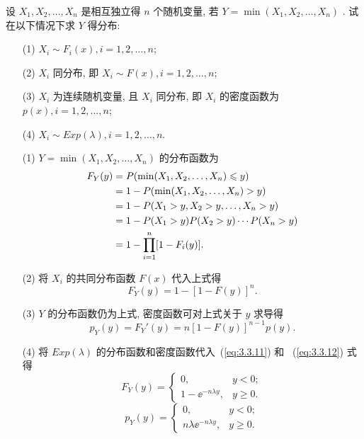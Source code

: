    \begin{example}[最小值分布]\label{exam:3.3.5}
   	设 $X_1,X_2,\ldots,X_n$ 是相互独立得 $n$ 个随机变量, 若 $Y=\min(X_1,X_2,\ldots,X_n)$ . 试在以下情况下求 $Y$ 得分布:
   	\begin{itemize}
   		\item[(1)] $X_i\sim F_i(x),i=1,2,\ldots,n$;
   		\item[(2)] $X_i$ 同分布, 即 $X_i\sim F(x),i=1,2,\ldots,n$;
   		\item[(3)] $X_i$ 为连续随机变量, 且 $X_i$ 同分布, 即 $X_i$ 的密度函数为 $p(x),i=1,2,\ldots,n$;
   		\item[(4)] $X_i\sim Exp(\lambda),i=1,2,\ldots,n$.
   	\end{itemize}
   	\begin{solution}
   		\begin{itemize}
   			\item[(1)] $Y=\min(X_1,X_2,\ldots,X_n)$ 的分布函数为
   			\begin{align}
   				F_Y(y)&=P(\min(X_1,X_2,\ldots,X_n)\leqslant y)\notag\\
   				&=1-P(\min(X_1,X_2,\ldots,X_n)>y)\notag\\
   				&=1-P(X_1>y,X_2>y,\ldots,X_n>y)\notag\\
   				&=1-P(X_1>y)P(X_2>y)\cdots P(X_n>y)\notag\\
   				&=1-\prod_{i=1}^{n}[1-F_i(y)].\label{eq:3.3.10}
   			\end{align}
   			\item[(2)] 将 $X_i$ 的共同分布函数 $F(x)$ 代入上式得
   			\begin{equation}
   				F_Y(y)=1-[1-F(y)]^n.\label{eq:3.3.11}
   			\end{equation}
   			\item[(3)] $Y$ 的分布函数仍为上式, 密度函数可对上式关于 $y$ 求导得
   			\begin{equation}
   				p_Y(y)=F_Y'(y)=n[1-F(y)]^{n-1}p(y).\label{eq:3.3.12}
   			\end{equation}
   			\item[(4)] 将 $Exp(\lambda)$ 的分布函数和密度函数代入~(\ref{eq:3.3.11}) 和 ~(\ref{eq:3.3.12}) 式得
   			\begin{equation*}
   				F_Y(y)=\begin{cases}
   					0, & y<0;\\
   					1-\ee^{-n\lambda y}, & y\geqslant0.
   				\end{cases}
   			\end{equation*}
   			\begin{equation*}
   				p_Y(y)=\begin{cases}
   					0, & y<0;\\
   					n\lambda\ee^{-n\lambda y}, & y\geqslant0.
   				\end{cases}
   			\end{equation*}
   		\end{itemize}
   	\end{solution}
   \end{example}

